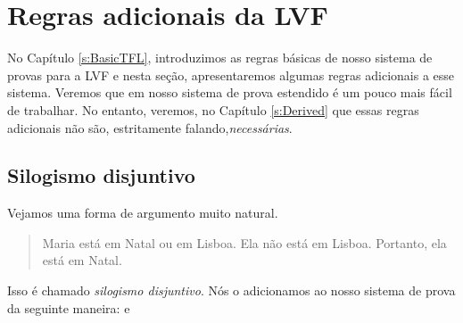 
\chapter{Regras adicionais da LVF}\label{s:Further}
No Cap\'itulo \ref{s:BasicTFL}, introduzimos as regras b\'asicas de nosso sistema de provas para a LVF e nesta se\c c\~ao, apresentaremos algumas regras adicionais a esse sistema.  Veremos que em  nosso sistema de prova estendido \'e um pouco mais f\'acil de trabalhar.  No entanto, veremos, no Cap\'itulo \ref{s:Derived} que essas regras adicionais n\~ao s\~ao, estritamente falando,\emph{necess\'arias}.


\section{Silogismo disjuntivo}
Vejamos uma forma de argumento muito natural.
	\begin{quote}
		Maria est\'a em Natal ou em Lisboa. Ela n\~ao est\'a em Lisboa. Portanto, ela est\'a em Natal.
	\end{quote}
Isso \'e chamado  \emph{silogismo disjuntivo}. N\'os o adicionamos ao nosso sistema de prova da seguinte maneira:
e

